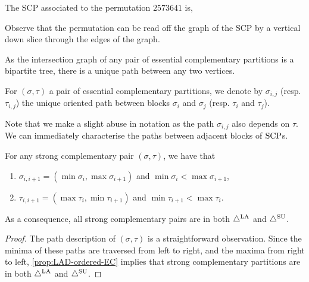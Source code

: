 \begin{example}
\label{ex:strong-complementary}
The SCP associated to the permutation $2573641$ is,
\begin{center}
\end{center}
Observe that the permutation can be read off the graph of the SCP by a vertical down slice through the edges of the graph.
\end{example}

As the intersection graph of any pair of essential complementary partitions is a bipartite tree, there is a unique path between any two vertices. 

\begin{definition}
    For $(\sigma,\tau)$ a pair of essential complementary partitions, we denote by $\sigma_{i,j}$ (resp. $\tau_{i,j}$) the unique oriented path between blocks $\sigma_{i}$ and $\sigma_j$ (resp. $\tau_{i}$ and $\tau_j$).
\end{definition}
Note that we make a slight abuse in notation as the path $\sigma_{i,j}$ also depends on $\tau$.
We can immediately characterise the paths between adjacent blocks of $\mathrm{SCP}$s.

\begin{proposition} 
\label{lem:SCP-path-desc}
For any strong complementary pair $(\sigma,\tau)$, we have that
\begin{enumerate}
    \item $ \sigma_{i,i+1} = ( \min \sigma_i, \max \sigma_{i+1} )$ and $\min \sigma_i< \max \sigma_{i+1}$, 
    \item $  \tau_{i,i+1} =  ( \max \tau_i, \min \tau_{i+1} )$ and $\min \tau_{i+1}< \max \tau_{i}$.
\end{enumerate}
As a consequence, all strong complementary pairs are in both $\triangle^{\mathrm{LA}}$ and $\triangle^{\mathrm{SU}}$.
\end{proposition}
\begin{proof}
The path description of $(\sigma,\tau)$ is a straightforward observation. 
Since the minima of these paths are traversed from left to right, and the maxima from right to left, \cref{prop:LAD-ordered-EC} implies that strong complementary partitions are in both $\triangle^{\mathrm{LA}}$ and $\triangle^{\mathrm{SU}}$.
\end{proof}

